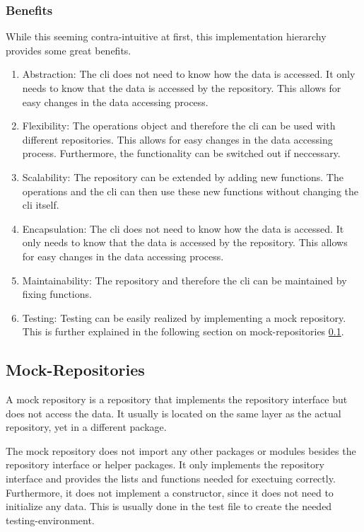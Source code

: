 \subsubsection*{Benefits}
While this seeming contra-intuitive at first, this implementation hierarchy provides some great benefits.
\begin{enumerate}
    \item Abstraction: The cli does not need to know how the data is accessed.
          It only needs to know that the data is accessed by the repository.
          This allows for easy changes in the data accessing process.
    \item Flexibility: The operations object and therefore the cli can be used with different repositories.
          This allows for easy changes in the data accessing process.
          Furthermore, the functionality can be switched out if neccessary.
    \item Scalability: The repository can be extended by adding new functions.
          The operations and the cli can then use these new functions without changing the cli itself.
    \item Encapsulation: The cli does not need to know how the data is accessed.
          It only needs to know that the data is accessed by the repository.
          This allows for easy changes in the data accessing process.
    \item Maintainability: The repository and therefore the cli can be maintained by fixing functions.
    \item Testing: Testing can be easily realized by implementing a mock repository.
          This is further explained in the following section on mock-repositories \ref*{sec:mock_repositories}.
\end{enumerate}

\subsection{Mock-Repositories}
\label{sec:mock_repositories}
A mock repository is a repository that implements the repository interface but does not access the data.
It usually is located on the same layer as the actual repository, yet in a different package.

The mock repository does not import any other packages or modules besides the repository interface or helper packages.
It only implements the repository interface and provides the lists and functions needed for exectuing correctly.
Furthermore, it does not implement a constructor, since it does not need to initialize any data.
This is usually done in the test file to create the needed testing-environment.

